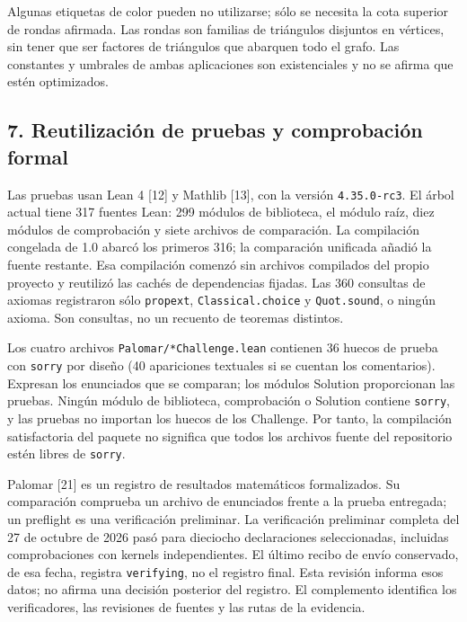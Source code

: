 \documentclass[spanish,11pt,a4paper]{article}
\begin{document}
Algunas etiquetas de color pueden no utilizarse; sólo se necesita la cota superior de rondas afirmada. Las rondas son familias de triángulos disjuntos en vértices, sin tener que ser factores de triángulos que abarquen todo el grafo. Las constantes y umbrales de ambas aplicaciones son existenciales y no se afirma que estén optimizados.

\subsection{7. Reutilización de pruebas y comprobación formal}\label{reutilizaciuxf3n-de-pruebas-y-comprobaciuxf3n-formal}

Las pruebas usan Lean 4 {[}12{]} y Mathlib {[}13{]}, con la versión \texttt{4.\allowbreak{}35.\allowbreak{}0-rc3}. El árbol actual tiene 317 fuentes Lean: 299 módulos de biblioteca, el módulo raíz, diez módulos de comprobación y siete archivos de comparación. La compilación congelada de 1.0 abarcó los primeros 316; la comparación unificada añadió la fuente restante. Esa compilación comenzó sin archivos compilados del propio proyecto y reutilizó las cachés de dependencias fijadas. Las 360 consultas de axiomas registraron sólo \texttt{propext}, \texttt{Classical.\allowbreak{}choice} y \texttt{Quot.\allowbreak{}sound}, o ningún axioma. Son consultas, no un recuento de teoremas distintos.

Los cuatro archivos \texttt{Palomar/\allowbreak{}*Challenge.\allowbreak{}lean} contienen 36 huecos de prueba con \texttt{sorry} por diseño (40 apariciones textuales si se cuentan los comentarios). Expresan los enunciados que se comparan; los módulos Solution proporcionan las pruebas. Ningún módulo de biblioteca, comprobación o Solution contiene \texttt{sorry}, y las pruebas no importan los huecos de los Challenge. Por tanto, la compilación satisfactoria del paquete no significa que todos los archivos fuente del repositorio estén libres de \texttt{sorry}.

Palomar {[}21{]} es un registro de resultados matemáticos formalizados. Su comparación comprueba un archivo de enunciados frente a la prueba entregada; un preflight es una verificación preliminar. La verificación preliminar completa del 27 de octubre de 2026 pasó para dieciocho declaraciones seleccionadas, incluidas comprobaciones con kernels independientes. El último recibo de envío conservado, de esa fecha, registra \texttt{verifying}, no el registro final. Esta revisión informa esos datos; no afirma una decisión posterior del registro. El complemento identifica los verificadores, las revisiones de fuentes y las rutas de la evidencia.
\end{document}
